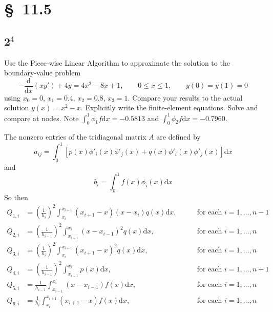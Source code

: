 \documentclass[12pt]{article}
\newcommand{\dd}[1]{\mathrm{d}{#1}}
\newcommand{\ddt}[1]{\frac{\dd{}}{\dd{#1}}}
\begin{document}
\section{\S~11.5}
\subsection{2$^4$}
Use the Piece-wise Linear Algorithm to approximate the solution to the
boundary-value problem 
$$ -\ddt{x}(xy')+4y=4x^2-8x+1,\qquad 0\leq x\leq1,\qquad
y(0)=y(1)=0 $$ using $x_0=0$, $x_1=0.4$, $x_2=0.8$, $x_3=1$. Compare
your results to the actual solution $y(x)=x^2-x$. Explicitly write the
finite-element equations. Solve and compare at nodes. Note $\int_0^1\phi_1 f
\dd{x} = -0.5813$ and $\int_0^1\phi_2 f \dd{x} = -0.7960$.

The nonzero entries of the tridiagonal matrix $A$ are defined by 
\begin{equation}
  \label{eq:piecewise-general-a}
  a_{ij} = \int_0^1[p(x)\phi'_i(x)\phi'_j(x)+q(x)\phi'_i(x)\phi'_j(x)]\dd{x}
\end{equation}
and
\begin{equation}
  \label{eq:piecewise-general-b}
  b_i = \int_0^1f(x)\phi_i(x)\dd{x}
\end{equation}
So then 
\begin{equation}
  \begin{aligned}
    Q_{1,i}&=\left(\frac{1}{h_{i}}\right)^2\int_{x_i}^{x_{i+1}}(x_{i+1}-x)(x-x_{i})q(x)\dd{x},
    \qquad & \text{for each }i=1,\ldots,n-1 \\
    Q_{2,i}&=\left(\frac{1}{h_{i-1}}\right)^2\int_{x_{i-1}}^{x_{i}}(x-x_{i-1})^2q(x)\dd{x},
    \qquad & \text{for each }i=1,\ldots,n \\
    Q_{3,i}&=\left(\frac{1}{h_{i}}\right)^2\int_{x_i}^{x_{i+1}}(x_{i+1}-x)^2q(x)\dd{x},
    \qquad & \text{for each }i=1,\ldots,n \\
    Q_{4,i}&=\left(\frac{1}{h_{i-1}}\right)^2\int_{x_{i-1}}^{x_{i}}p(x)\dd{x},
    \qquad&  \text{for each }i=1,\ldots,n+1 \\
    Q_{5,i}&=\frac{1}{h_{i-1}}\int_{x_{i-1}}^{x_{i}}(x-x_{i-1})f(x)\dd{x},
    \qquad & \text{for each }i=1,\ldots,n \\
    Q_{6,i}&=\frac{1}{h_{i}}\int_{x_i}^{x_{i+1}}(x_{i+1}-x)f(x)\dd{x},
    \qquad & \text{for each }i=1,\ldots,n \\
  \end{aligned}
\end{equation}
\end{document}
